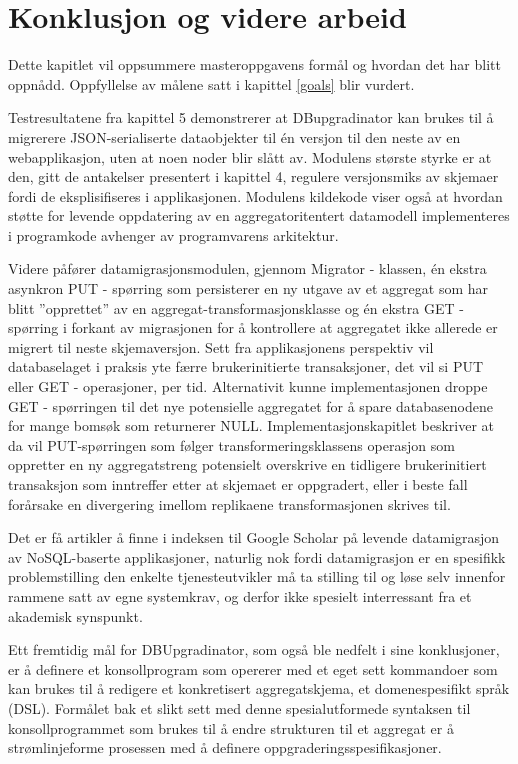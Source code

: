 
\chapter{Konklusjon og videre arbeid}

Dette kapitlet vil oppsummere masteroppgavens formål og hvordan det har blitt oppnådd. Oppfyllelse av målene satt i kapittel \ref{goals} blir vurdert.

Testresultatene fra kapittel 5 demonstrerer at DBupgradinator kan brukes til å migrerere JSON-serialiserte dataobjekter til én versjon til den neste av en webapplikasjon, uten at noen noder blir slått av. Modulens største styrke er at den, gitt de antakelser presentert i kapittel 4, regulere versjonsmiks av skjemaer fordi de eksplisifiseres i applikasjonen. Modulens kildekode viser også at hvordan støtte for levende oppdatering av en aggregatoritentert datamodell implementeres i programkode avhenger av programvarens arkitektur.

Videre påfører datamigrasjonsmodulen, gjennom Migrator - klassen, én ekstra asynkron PUT - spørring som persisterer en ny utgave av et aggregat som har blitt ''opprettet'' av en aggregat-transformasjonsklasse og én ekstra GET - spørring i forkant av migrasjonen for å kontrollere at aggregatet ikke allerede er migrert til neste skjemaversjon. Sett fra applikasjonens perspektiv vil databaselaget i praksis yte færre brukerinitierte transaksjoner, det vil si PUT eller GET - operasjoner, per tid. Alternativit kunne implementasjonen droppe GET - spørringen til det nye potensielle aggregatet for å spare databasenodene for mange bomsøk som returnerer NULL. Implementasjonskapitlet beskriver at da vil PUT-spørringen som følger transformeringsklassens operasjon som oppretter en ny aggregatstreng potensielt overskrive en tidligere brukerinitiert transaksjon som inntreffer etter at skjemaet er oppgradert, eller i beste fall forårsake en divergering imellom replikaene transformasjonen skrives til.

Det er få artikler å finne i indeksen til Google Scholar på levende datamigrasjon av NoSQL-baserte applikasjoner, naturlig nok fordi datamigrasjon er en spesifikk problemstilling den enkelte tjenesteutvikler må ta stilling til og løse selv innenfor rammene satt av egne systemkrav, og derfor ikke spesielt interressant fra et akademisk synspunkt. 

Ett fremtidig mål for DBUpgradinator, som også ble nedfelt i \cite{saur2016} sine konklusjoner, er å definere et konsollprogram som opererer med et eget sett kommandoer som kan brukes til å redigere et konkretisert aggregatskjema, et domenespesifikt språk (DSL).  Formålet bak et slikt sett med denne spesialutformede syntaksen til konsollprogrammet som brukes til å endre strukturen til et aggregat er å strømlinjeforme prosessen med å definere oppgraderingsspesifikasjoner.

\cleardoublepage

